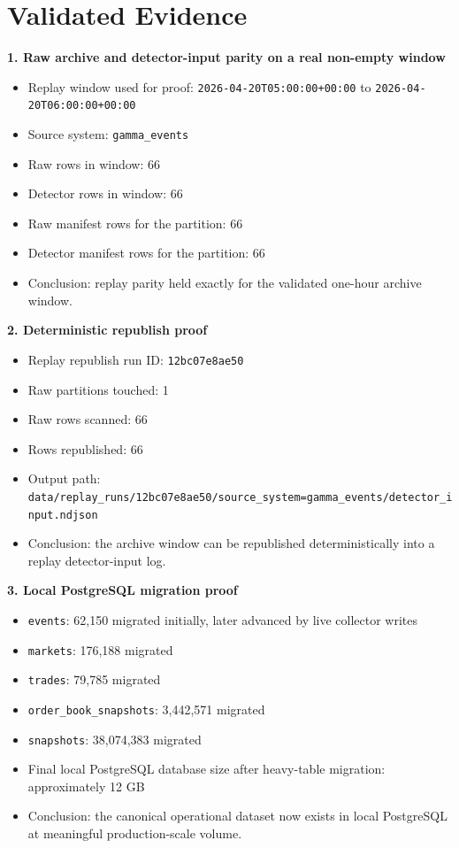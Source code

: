 \documentclass{article}
\begin{document}
\section*{Validated Evidence}
\textbf{1. Raw archive and detector-input parity on a real non-empty window}
\begin{itemize}
\item Replay window used for proof: \texttt{2026-04-20T05:00:00+00:00} to \texttt{2026-04-20T06:00:00+00:00}
\item Source system: \texttt{gamma\_events}
\item Raw rows in window: 66
\item Detector rows in window: 66
\item Raw manifest rows for the partition: 66
\item Detector manifest rows for the partition: 66
\item Conclusion: replay parity held exactly for the validated one-hour archive window.
\end{itemize}

\textbf{2. Deterministic republish proof}
\begin{itemize}
\item Replay republish run ID: \texttt{12bc07e8ae50}
\item Raw partitions touched: 1
\item Raw rows scanned: 66
\item Rows republished: 66
\item Output path: \texttt{data/replay\_runs/12bc07e8ae50/source\_system=gamma\_events/detector\_input.ndjson}
\item Conclusion: the archive window can be republished deterministically into a replay detector-input log.
\end{itemize}

\textbf{3. Local PostgreSQL migration proof}
\begin{itemize}
\item \texttt{events}: 62,150 migrated initially, later advanced by live collector writes
\item \texttt{markets}: 176,188 migrated
\item \texttt{trades}: 79,785 migrated
\item \texttt{order\_book\_snapshots}: 3,442,571 migrated
\item \texttt{snapshots}: 38,074,383 migrated
\item Final local PostgreSQL database size after heavy-table migration: approximately 12 GB
\item Conclusion: the canonical operational dataset now exists in local PostgreSQL at meaningful production-scale volume.
\end{itemize}
\end{document}
